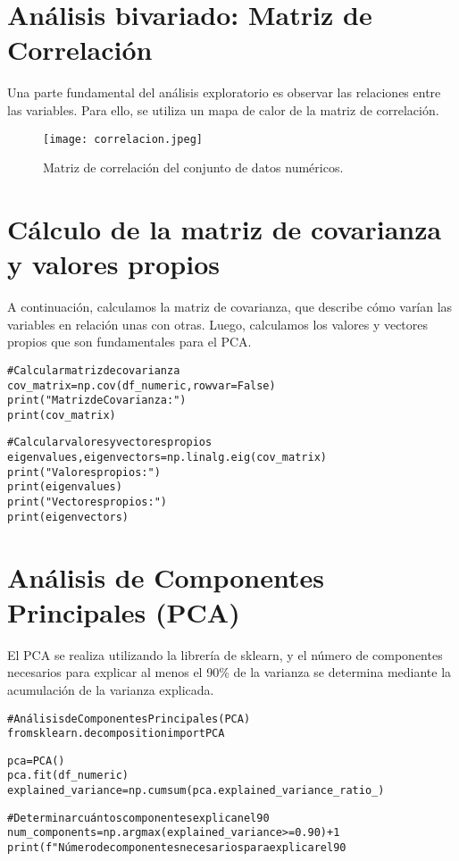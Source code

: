 \documentclass[a4paper, 10pt]{article}
\begin{document}
\section{Análisis bivariado: Matriz de Correlación}
Una parte fundamental del análisis exploratorio es observar las relaciones entre las variables. Para ello, se utiliza un mapa de calor de la matriz de correlación.

\begin{figure}[ht]
\centering
\texttt{[image: correlacion.jpeg]}
\caption{Matriz de correlación del conjunto de datos numéricos.}\label{fig:heatmap}
\end{figure}

\section{Cálculo de la matriz de covarianza y valores propios}
A continuación, calculamos la matriz de covarianza, que describe cómo varían las variables en relación unas con otras. Luego, calculamos los valores y vectores propios que son fundamentales para el PCA.

\begin{alltt}
# Calcular matriz de covarianza
cov_matrix = np.cov(df_numeric, rowvar=False)
print("Matriz de Covarianza:")
print(cov_matrix)

# Calcular valores y vectores propios
eigenvalues, eigenvectors = np.linalg.eig(cov_matrix)
print("Valores propios:")
print(eigenvalues)
print("Vectores propios:")
print(eigenvectors)
\end{alltt}

\section{Análisis de Componentes Principales (PCA)}
El PCA se realiza utilizando la librería de sklearn, y el número de componentes necesarios para explicar al menos el 90\% de la varianza se determina mediante la acumulación de la varianza explicada.

\begin{alltt}
# Análisis de Componentes Principales (PCA)
from sklearn.decomposition import PCA

pca = PCA()
pca.fit(df_numeric)
explained_variance = np.cumsum(pca.explained_variance_ratio_)

# Determinar cuántos componentes explican el 90% de la varianza
num_components = np.argmax(explained_variance >= 0.90) + 1
print(f"Número de componentes necesarios para explicar el 90% de la varianza: {num_components}")
\end{alltt}
\end{document}

